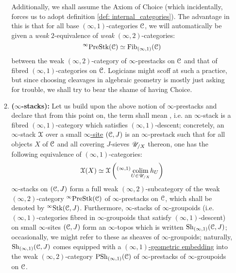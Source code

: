 \begin{convention}
\begin{enumerate}
\begin{enumerate}
                            Additionally, we shall assume the Axiom of Choice (which incidentally, forces us to adopt definition \ref{def: internal_categories}). The advantage in this is that for all base $(\infty, 1)$-categories $\mathcal{C}$, we will automatically be given a \textit{weak} $2$-equivalence of \textit{weak} $(\infty, 2)$-categories:
                                $${}^{\infty}\mathrm{Pre}\mathrm{Stk}(\mathcal{C}) \simeq \mathrm{Fib}_{(\infty, 1)}(\mathcal{C})$$
                            between the weak $(\infty, 2)$-category of $\infty$-prestacks on $\mathcal{C}$ and that of fibred $(\infty, 1)$-categories on $\mathcal{C}$. Logicians might scoff at such a practice, but since choosing cleavages in algebraic geometry is mostly just asking for trouble, we shall try to bear the shame of having Choice.
                            \item \textbf{($\infty$-stacks):} Let us build upon the above notion of $\infty$-prestacks and declare that from this point on, the term  shall mean , i.e. an $\infty$-stack is a fibred $(\infty, 1)$-category which satisfies $(\infty, 1)$-descent; concretely, an $\infty$-stack $\mathcal{X}$ over a small \href{https://ncatlab.org/nlab/show/(infinity,1)-site}{\underline{$\infty$-site}} $(\mathcal{C}, J)$ is an $\infty$-prestack such that for all objects $X$ of $\mathcal{C}$ and all covering $J$-sieves $\mathscr{U}_{/X}$ thereon, one has the following equivalence of $(\infty, 1)$-categories:
                                $$\mathcal{X}(X) \simeq \mathcal{X}\left({}^{(\infty, 1)}\underset{U \in \mathscr{U}_{/X}}{\operatorname{colim}} h_U\right)$$
                            $\infty$-stacks on $(\mathcal{C}, J)$ form a full weak $(\infty, 2)$-subcategory of the weak $(\infty, 2)$-category ${}^{\infty}\mathrm{Pre}\mathrm{Stk}(\mathcal{C})$ of $\infty$-prestacks on $\mathcal{C}$, which shall be denoted by ${}^{\infty}\mathrm{Stk}(\mathcal{C}, J)$. Furthermore, $\infty$-stacks of $\infty$-groupoids (i.e. $(\infty, 1)$-categories fibred in $\infty$-groupoids that satisfy $(\infty, 1)$-descent) on small $\infty$-sites $(\mathcal{C}, J)$ form an $\infty$-topos which is written $\mathrm{Sh}_{(\infty, 1)}(\mathcal{C}, J)$; occasionally, we might refer to these as sheaves of $\infty$-groupoids; naturally, $\mathrm{Sh}_{(\infty, 1)}(\mathcal{C}, J)$ comes equipped with a \href{https://ncatlab.org/nlab/show/(infinity,1)-topos#AsAGeometricEmbedding}{\underline{$(\infty, 1)$-geometric embedding}} into the weak $(\infty, 2)$-category $\mathrm{PSh}_{(\infty, 1)}(\mathcal{C})$ of $\infty$-prestacks of $\infty$-groupoids on $\mathcal{C}$.
                        \end{enumerate}

\end{enumerate}
\end{convention}
